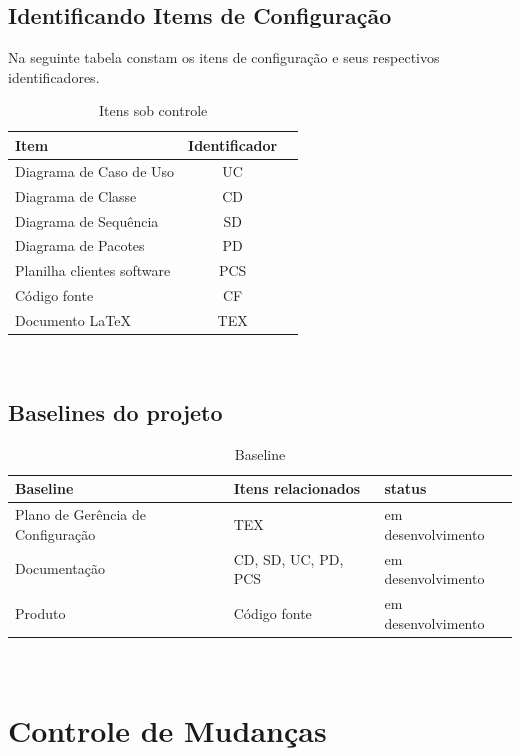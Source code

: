 \documentclass{article}
\begin{document}
	    \subsection{Identificando Items de Configuração}
          Na seguinte tabela constam os itens de configuração e seus respectivos identificadores.
	  	\begin{table}[H]
			\begin{tabular}{l c r}
                  \textbf{Item} & \textbf{Identificador}\\
                  \hline
                  Diagrama de Caso de Uso & UC \\
                  Diagrama de Classe & CD \\
                  Diagrama de Sequência  & SD \\
                  Diagrama de Pacotes  & PD \\
                  Planilha clientes software & PCS\\
                  Código fonte  & CF\\
                  Documento LaTeX & TEX \\
              \end{tabular}\\
              \caption{Itens sob controle}
          \end{table}
          \subsection{Baselines do projeto}
          \begin{table}[H]
              \begin{tabular}{l l l}
                  \textbf{Baseline} & \textbf{Itens relacionados} & \textbf{status}\\
                  \hline
                  Plano de Gerência de Configuração & TEX & em desenvolvimento \\
                  Documentação & CD, SD, UC, PD, PCS & em desenvolvimento \\
                  Produto & Código fonte & em desenvolvimento\\
              \end{tabular}\\
              \caption{Baseline}
          \end{table}
    \section{Controle de Mudanças}
\end{document}
